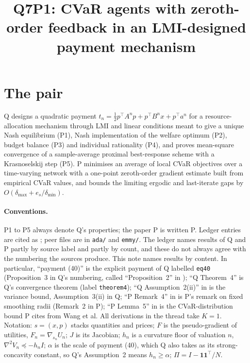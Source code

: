 \documentclass{article}
\title{Q7P1: CVaR agents with zeroth-order feedback in an LMI-designed payment mechanism}
\begin{document}
\maketitle

\section{The pair}

Q designs a quadratic payment \(t_n=\tfrac12p^\top A^np+p^\top B^nx+p^\top a^n\) for a resource-allocation mechanism through LMI and linear conditions meant to give a unique Nash equilibrium (P1), Nash implementation of the welfare optimum (P2), budget balance (P3) and individual rationality (P4), and proves mean-square convergence of a sample-average proximal best-response scheme with a Krasnoselskij step (P5).
P minimises an average of local CVaR objectives over a time-varying network with a one-point zeroth-order gradient estimate built from empirical CVaR values, and bounds the limiting ergodic and last-iterate gaps by \(O(\delta_{\max}+e_s/\delta_{\min})\).

\paragraph{Conventions.}
P1 to P5 always denote Q's properties; the paper P is written P. Ledger entries are cited as ; peer files are in \texttt{ada/} and \texttt{emmy/}. The ledger names results of Q and P partly by source label and partly by count, and these do not always agree with the numbering the sources produce. This note names results by content. In particular, ``payment (40)'' is the explicit payment of Q labelled \texttt{eq40} (Proposition~3 in Q's numbering, called ``Proposition~2'' in ); ``Q Theorem~4'' is Q's convergence theorem (label \texttt{theorem4}); ``Q Assumption~2(ii)'' in  is the variance bound, Assumption~3(ii) in Q; ``P Remark~4'' in  is P's remark on fixed smoothing radii (Remark~2 in P); ``P Lemma~5'' in  is the CVaR-distribution bound P cites from Wang et al. All derivations in the thread take \(K=1\). Notation: \(s=(x,p)\) stacks quantities and prices; \(F\) is the pseudo-gradient of utilities, \(F_n=\nabla_{s_n}U_n\); \(J\) is its Jacobian; \(h_n\) is a curvature floor of valuation \(n\), \(\nabla^2V_n\preceq-h_nI\); \(\alpha\) is the scale of payment (40), which Q also takes as its strong-concavity constant, so Q's Assumption~2 means \(h_n\ge\alpha\); \(\Pi=I-\mathbf 1\mathbf 1^\top/N\).
\end{document}
